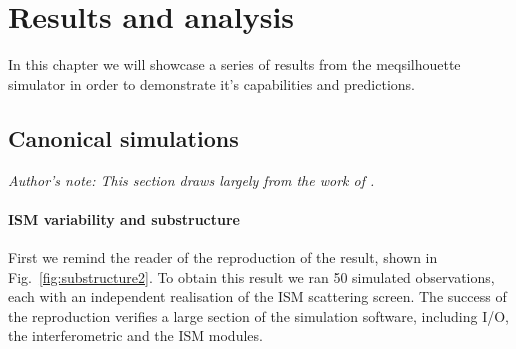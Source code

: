 \chapter{Results and analysis}
In this chapter we will showcase a series of results from the {\sc meqsilhouette} simulator in order to demonstrate it's capabilities and predictions.


\section{Canonical simulations}\label{sec:can_sim}
{\it Author's note: This section draws largely from the work of \citet{Blecher_2016}.}

\subsubsection{ISM variability and substructure}
First we remind the reader of the reproduction of the \citet{Ortiz_2016} result, shown in Fig.~\ref{fig:substructure2}. To obtain this result we ran 50 simulated observations, each with an independent realisation of the ISM scattering screen. The success of the reproduction verifies a large section of the simulation software, including I/O, the interferometric and the ISM modules. 

